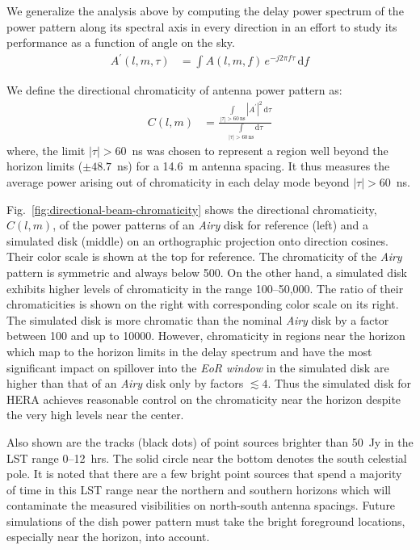 \documentclass[preprint2,iop,numberedappendix,twocolappendix,appendixfloats]{emulateapj}
\newcommand{\dif}{\mathrm{d}}
\begin{document}
We generalize the analysis above by computing the delay power spectrum of the power pattern along its spectral axis in every direction in an effort to study its performance as a function of angle on the sky. 
\begin{align}
  A^\prime(l,m,\tau) &= \int A(l,m,f)\,e^{-j 2\pi f\tau} \,\dif f
\end{align}

We define the directional chromaticity of antenna power pattern as:
\begin{align}
  C(l,m) &= \frac{ \int\limits_{|\tau|>60\,\textrm{ns}} |A^\prime|^2 \,\dif\tau }{\int\limits_{|\tau|>60\,\textrm{ns}} \dif\tau}
\end{align}
where, the limit $|\tau|>60$~ns was chosen to represent a region well beyond the horizon limits ($\pm 48.7$~ns) for a 14.6~m antenna spacing. It thus measures the average power arising out of chromaticity in each delay mode beyond $|\tau|>60$~ns. 

Fig.~\ref{fig:directional-beam-chromaticity} shows the directional chromaticity, $C(l,m)$, of the power patterns of an {\it Airy} disk for reference (left) and a simulated disk (middle) on an orthographic projection onto direction cosines. Their color scale is shown at the top for reference. The chromaticity of the {\it Airy} pattern is symmetric and always below 500. On the other hand,  a simulated disk exhibits higher levels of chromaticity in the range 100--50,000. The ratio of their chromaticities is shown on the right with corresponding color scale on its right. The simulated disk is more chromatic than the nominal {\it Airy} disk by a factor between 100 and up to 10000. However, chromaticity in regions near the horizon which map to the horizon limits in the delay spectrum and have the most significant impact on spillover into the {\it EoR window} in the simulated disk are higher than that of an {\it Airy} disk only by factors $\lesssim 4$. Thus the simulated disk for HERA achieves reasonable control on the chromaticity near the horizon despite the very high levels near the center. 

Also shown are the tracks (black dots) of point sources brighter than 50~Jy in the LST range 0--12~hrs. The solid circle near the bottom denotes the south celestial pole. It is noted that there are a few bright point sources that spend a majority of time in this LST range near the northern and southern horizons which will contaminate the measured visibilities on north-south antenna spacings. Future simulations of the dish power pattern must take the bright foreground locations, especially near the horizon, into account.
\end{document}
